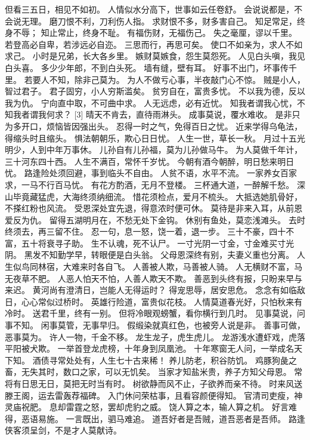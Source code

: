 \documentclass[12pt,UTF8]{ctexbook}
\begin{document}
但看三五日，相见不如初。
人情似水分高下，世事如云任卷舒。
会说说都是，不会说无理。
磨刀恨不利，刀利伤人指。
求财恨不多，财多害自己。
知足常足，终身不辱；
知止常止，终身不耻。
有福伤财，无福伤己。
失之毫厘，谬以千里。
若登高必自卑，若涉远必自迩。
三思而行，再思可矣。
使口不如亲为，求人不如求己。
小时是兄弟，长大各乡里。
嫉财莫嫉食，怨生莫怨死。
人见白头嗔，我见白头喜。
多少少年郎，不到白头死。
墙有缝，壁有耳。
好事不出门，坏事传千里。
若要人不知，除非己莫为。
为人不做亏心事，半夜敲门心不惊。
贼是小人，智过君子。
君子固穷，小人穷斯滥矣。
贫穷自在，富贵多忧。
不以我为德，反以我为仇。
宁向直中取，不可曲中求。
人无远虑，必有近忧。
知我者谓我心忧，不知我者谓我何求？ [3]
晴天不肯去，直待雨淋头。
成事莫说，覆水难收。
是非只为多开口，烦恼皆因强出头。
忍得一时之气，免得百日之忧。
近来学得乌龟法，得缩头时且缩头。
惧法朝朝乐，欺心日日忧。
人生一世，草长一秋。
月过十五光明少，人到中年万事休。
儿孙自有儿孙福，莫为儿孙做马牛。
为人莫做千年计，三十河东四十西。
人生不满百，常怀千岁忧。
今朝有酒今朝醉，明日愁来明日忧。
路逢险处须回避，事到临头不自由。
人贫不语，水平不流。
一家养女百家求，一马不行百马忧。
有花方酌酒，无月不登楼。
三杯通大道，一醉解千愁。
深山毕竟藏猛虎，大海终须纳细流。
惜花须检点，爱月不梳头。
大抵选她肌骨好，不搽红粉也风流。
受恩深处宜先退，得意浓时便可休。
莫待是非来入耳，从前恩爱反为仇。
留得五湖明月在，不愁无处下金钩。
休别有鱼处，莫恋浅滩头。
去时终须去，再三留不住。
忍一句，息一怒，饶一着，退一步。
三十不豪，四十不富，五十将衰寻子助。
生不认魂，死不认尸。
一寸光阴一寸金，寸金难买寸光阴。
黑发不知勤学早，转眼便是白头翁。
父母恩深终有别，夫妻义重也分离。
人生似鸟同林宿，大难来时各自飞。
人善被人欺，马善被人骑。
人无横财不富，马无夜草不肥。
人恶人怕天不怕，人善人欺天不欺。
善恶到头终有报，只盼来早与来迟。
黄河尚有澄清日，岂能人无得运时？
得宠思辱，居安思危。
念念有如临敌日，心心常似过桥时。
英雄行险道，富贵似花枝。
人情莫道春光好，只怕秋来有冷时。
送君千里，终有一别。
但将冷眼观螃蟹，看你横行到几时。
见事莫说，问事不知。
闲事莫管，无事早归。
假缎染就真红色，也被旁人说是非。
善事可做，恶事莫为。
许人一物，千金不移。
龙生龙子，虎生虎儿。
龙游浅水遭虾戏，虎落平阳被犬欺。
一举首登龙虎榜，十年身到凤凰池。
十年寒窗无人问，一举成名天下知。
酒债寻常处处有，人生七十古来稀！
养儿防老，积谷防饥。
鸡豚狗彘之畜，无失其时，数口之家，可以无饥矣。
当家才知盐米贵，养子方知父母恩。
常将有日思无日，莫把无时当有时。
树欲静而风不止，子欲养而亲不待。
时来风送滕王阁，运去雷轰荐福碑。
入门休问荣枯事，且看容颜便得知。
官清司吏瘦，神灵庙祝肥。
息却雷霆之怒，罢却虎豹之威。
饶人算之本，输人算之机。
好言难得，恶语易施。
一言既出，驷马难追。
道吾好者是吾贼，道吾恶者是吾师。
路逢侠客须呈剑，不是才人莫献诗。
\end{document}
